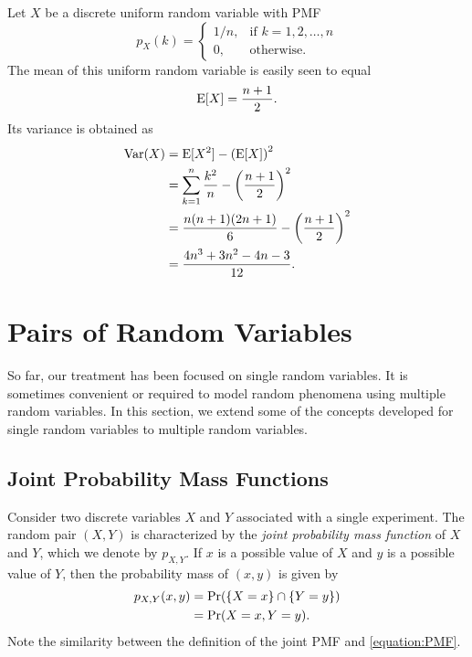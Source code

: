 \begin{example}
Let $X$ be a discrete uniform random variable with PMF
\begin{equation*}
p_X (k) = \left\{ \begin{array}{ll}
1/n, & \text{if }k = 1, 2, \ldots, n \\
0, & \text{otherwise} .
\end{array} \right.
\end{equation*}
The mean of this uniform random variable is easily seen to equal
\begin{equation*}
\mathrm{E} [X] = \frac{n+1}{2} .
\end{equation*}
Its variance is obtained  as
\begin{equation*}
\begin{split}
\mathrm{Var} (X) &= \mathrm{E} [X^2] - \left( \mathrm{E} [X] \right)^2 \\
&= \sum_{k=1}^n \frac{k^2}{n} - \left( \frac{n+1}{2} \right)^2 \\
&= \frac{n(n+1)(2n+1)}{6} - \left( \frac{n+1}{2} \right)^2 \\
&= \frac{4 n^3 + 3 n^2 - 4 n -3}{12} .
\end{split}
\end{equation*}
\end{example}


\section{Pairs of Random Variables}

So far, our treatment has been focused on single random variables.
It is sometimes convenient or required to model random phenomena using multiple random variables.
In this section, we extend some of the concepts developed for single random variables to multiple random variables.

\subsection{Joint Probability Mass Functions}

Consider two discrete variables $X$ and $Y$ associated with a single experiment.
The random pair $(X, Y)$ is characterized by the \emph{joint probability mass function} of $X$ and $Y$, which we denote by $p_{X,Y}$.
If $x$ is a possible value of $X$ and $y$ is a possible value of $Y$, then the probability mass of $(x, y)$ is given by
\begin{equation*}
\begin{split}
p_{X,Y} (x, y) &= \Pr ( \{ X = x \} \cap \{ Y = y \} ) \\
&= \Pr ( X = x, Y = y ).
\end{split}
\end{equation*}
Note the similarity between the definition of the joint PMF and \eqref{equation:PMF}.

